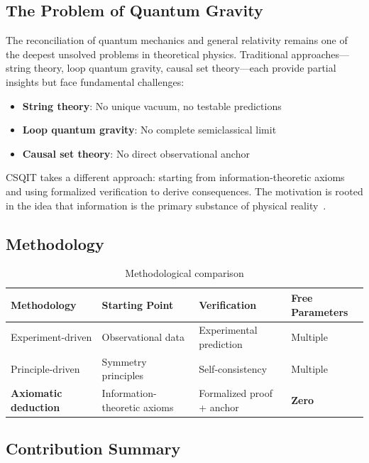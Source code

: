 \documentclass[aps,prd,twocolumn,nofootinbib,floatfix]{revtex4-2}
\begin{document}
\subsection{The Problem of Quantum Gravity}

The reconciliation of quantum mechanics and general relativity remains one of the deepest unsolved problems in theoretical physics. Traditional approaches---string theory, loop quantum gravity, causal set theory---each provide partial insights but face fundamental challenges:

\begin{itemize}
    \item \textbf{String theory}: No unique vacuum, no testable predictions
    \item \textbf{Loop quantum gravity}: No complete semiclassical limit
    \item \textbf{Causal set theory}: No direct observational anchor
\end{itemize}

CSQIT takes a different approach: starting from information-theoretic axioms and using formalized verification to derive consequences. The motivation is rooted in the idea that information is the primary substance of physical reality~\cite{Wheeler1989}.

\subsection{Methodology}

\begin{table}[h]
\centering
\begin{tabular}{llll}
\hline
Methodology & Starting Point & Verification & Free Parameters \\
\hline
Experiment-driven & Observational data & Experimental prediction & Multiple \\
Principle-driven & Symmetry principles & Self-consistency & Multiple \\
\textbf{Axiomatic deduction} & Information-theoretic axioms & Formalized proof + anchor & \textbf{Zero} \\
\hline
\end{tabular}
\caption{Methodological comparison}
\label{tab:methodology}
\end{table}

\subsection{Contribution Summary}
\end{document}
